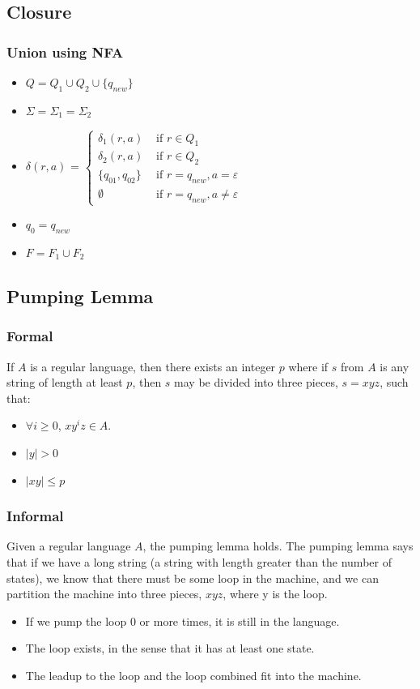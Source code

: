 \documentclass{article}
\begin{document}
\subsection{Closure}
\subsubsection{Union using NFA}
\begin{itemize}
    \item $Q = Q_1 \cup Q_2 \cup \{q_{new}\}$
    \item $\Sigma = \Sigma_1 = \Sigma_2$
    \item $\delta(r,a)$ = 
    $\begin{cases}
    \delta_1(r,a) & \textrm{ if } r \in Q_1\\
    \delta_2(r,a) & \textrm{ if } r \in Q_2\\
    \{q_{01}, q_{02}\} & \textrm{ if } r = q_{new}, a = \varepsilon\\
    \emptyset & \textrm{ if } r=q_{new}, a \neq \varepsilon
    \end{cases}$
    \item $q_0 = q_{new}$
    \item $F = F_1 \cup F_2$
\end{itemize}

\subsection{Pumping Lemma}
\subsubsection{Formal}
If $A$ is a regular language, then there exists an integer $p$ where if $s$ from $A$ is any string of length at least $p$, then $s$ may be divided into three pieces, $s=xyz$, such that:
\begin{itemize}
    \item $\forall i \geq 0$, $xy^{i}z \in A$.
    \item $|y| > 0$
    \item $|xy| \leq p$
\end{itemize}
\subsubsection{Informal}
Given a regular language $A$, the pumping lemma holds. The pumping lemma says that if we have a long string (a string with length greater than the number of states), we know that there must be some loop in the machine, and we can partition the machine into three pieces, $xyz$, where y is the loop.
\begin{itemize}
    \item If we pump the loop 0 or more times, it is still in the language.
    \item The loop exists, in the sense that it has at least one state.
    \item The leadup to the loop and the loop combined fit into the machine.
\end{itemize}
\end{document}
